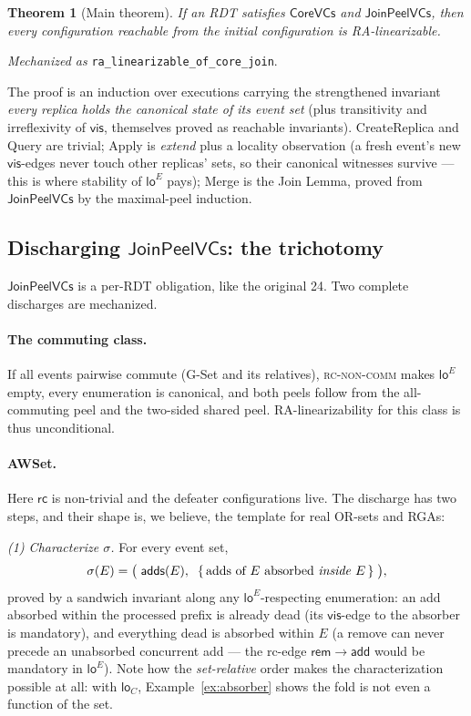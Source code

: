 \documentclass[11pt]{article}
\newtheorem{theorem}{Theorem}[section]
\newcommand{\add}{\mathsf{add}}
\newcommand{\rem}{\mathsf{rem}}
\newcommand{\loE}[1]{\mathsf{lo}^{#1}}
\newcommand{\co}{\mathsf{CoreVCs}}
\newcommand{\jp}{\mathsf{JoinPeelVCs}}
\newcommand{\lean}[1]{\texttt{#1}}
\begin{document}
\begin{theorem}[Main theorem]
\label{thm:main}
If an RDT satisfies $\co$ and $\jp$, then every configuration reachable
from the initial configuration is RA-linearizable.
\end{theorem}

\noindent\emph{Mechanized as} \lean{ra\_linearizable\_of\_core\_join}.

\noindent The proof is an induction over executions carrying the
strengthened invariant \emph{every replica holds the canonical state of
its event set} (plus transitivity and irreflexivity of $\mathsf{vis}$,
themselves proved as reachable invariants). CreateReplica and Query are
trivial; Apply is \emph{extend} plus a locality observation (a fresh
event's new $\mathsf{vis}$-edges never touch other replicas' sets, so
their canonical witnesses survive --- this is where stability of
$\loE{E}$ pays); Merge is the Join Lemma, proved from $\jp$ by the
maximal-peel induction.

\subsection{Discharging $\jp$: the trichotomy}
\label{sec:discharge}

$\jp$ is a per-RDT obligation, like the original 24. Two complete
discharges are mechanized.

\paragraph{The commuting class.} If all events pairwise commute (G-Set
and its relatives), \textsc{rc-non-comm} makes $\loE{E}$ empty, every
enumeration is canonical, and both peels follow from the all-commuting
peel and the two-sided shared peel. RA-linearizability for this class is
thus unconditional.

\paragraph{\textsf{AWSet}.} Here $\mathsf{rc}$ is non-trivial and the
defeater configurations live. The discharge has two steps, and their
shape is, we believe, the template for real OR-sets and RGAs:

\emph{(1) Characterize $\sigma$.} For every event set,
\[
\sigma(E) = \bigl(\;\mathsf{adds}(E),\;\;
\{\,\text{adds of } E \text{ absorbed \emph{inside} } E\,\}\;\bigr),
\]
proved by a sandwich invariant along any $\loE{E}$-respecting
enumeration: an add absorbed within the processed prefix is already dead
(its $\mathsf{vis}$-edge to the absorber is mandatory), and everything
dead is absorbed within $E$ (a remove can never precede an unabsorbed
concurrent add --- the rc-edge $\rem \to \add$ would be mandatory in
$\loE{E}$). Note how the \emph{set-relative} order makes the
characterization possible at all: with $\mathsf{lo}_C$,
Example~\ref{ex:absorber} shows the fold is not even a function of the
set.
\end{document}

